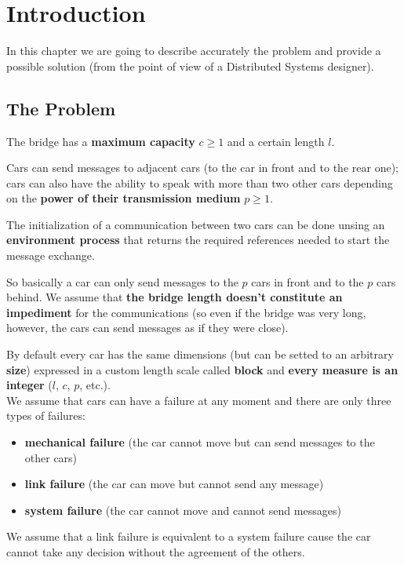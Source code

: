 \chapter{Introduction}\label{ch:intro}

In this chapter we are going to describe accurately the problem and provide a possible 
solution (from the point of view of a Distributed Systems designer).\\


\section{The Problem}

The bridge has a \textbf{maximum capacity} $c \geq 1$ and a certain length $l$. 

Cars can send messages to adjacent cars (to the car in front and to the rear one); 
cars can also have the ability to speak with more than two other cars depending on the 
\textbf{power of their transmission medium} $p \geq 1$.

The initialization of a communication between two cars can be done unsing an 
\textbf{environment process} 
that returns the required references needed to start the message exchange.

So basically a car can only send messages to the $p$ cars in front and 
to the $p$ cars behind. We assume that \textbf{the bridge length doesn't 
constitute an impediment}
for the communications (so even if the bridge was very long, however, 
the cars can send messages as if they were close).

By default every car has the same dimensions (but can be setted to an arbitrary
\textbf{size}) expressed in a custom length scale called \textbf{block} and 
\textbf{every measure is an integer} ($l$, $c$, $p$, etc.). \\

\noindent
We assume that cars can have a failure at any moment and there are only 
three types of failures:
\begin{itemize}
    \item \textbf{mechanical failure} (the car cannot move but can send messages to the other cars)
    \item \textbf{link failure} (the car can move but cannot send any message)
    \item \textbf{system failure} (the car cannot move and cannot send messages)
\end{itemize}

\noindent
We assume that a link failure is equivalent to a system failure cause the car cannot 
take any decision without the agreement of the others. 

